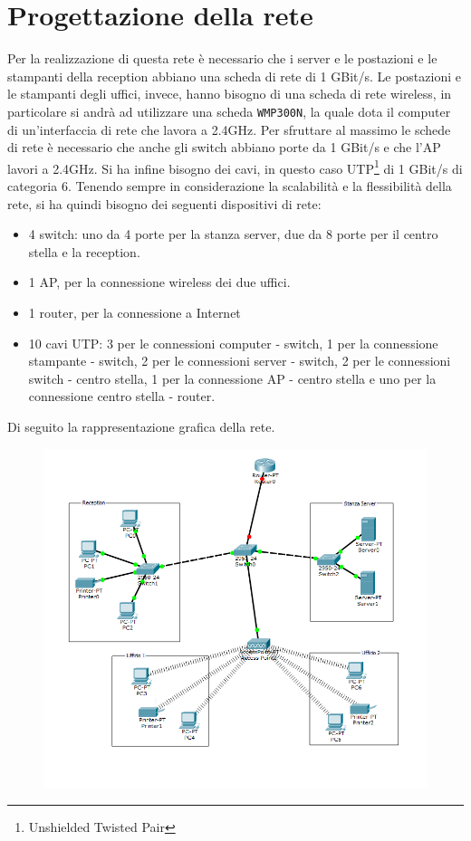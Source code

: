 \section{Progettazione della rete}
\hspace{24pt}Per la realizzazione di questa rete è necessario che i server e le postazioni e le stampanti della reception abbiano una scheda di rete di 1 GBit/s. Le postazioni e le stampanti degli uffici, invece, hanno bisogno di una scheda di rete wireless, in particolare si andrà ad utilizzare una scheda \texttt{WMP300N}, la quale dota il computer di un'interfaccia di rete che lavora a 2.4GHz. Per sfruttare al massimo le schede di rete è necessario che anche gli switch abbiano porte da 1 GBit/s e che l'AP lavori a 2.4GHz. Si ha infine bisogno dei cavi, in questo caso UTP\footnote{Unshielded Twisted Pair} di 1 GBit/s di categoria 6. Tenendo sempre in considerazione la scalabilità e la flessibilità della rete, si ha quindi bisogno dei seguenti dispositivi di rete:\\
\begin{itemize}
	\item 4 switch: uno da 4 porte per la stanza server, due da 8 porte per il centro stella e la reception.
	\item 1 AP, per la connessione wireless dei due uffici.
	\item 1 router, per la connessione a Internet
	\item 10 cavi UTP: 3 per le connessioni computer - switch, 1 per la connessione stampante - switch, 2 per le connessioni server - switch, 2 per le connessioni switch - centro stella, 1 per la connessione AP - centro stella e uno per la connessione centro stella - router.
\end{itemize}
Di seguito la rappresentazione grafica della rete.
\vspace{30pt}
\begin{figure}[!h]
	\includegraphics[scale=0.81]{progettazione_rete}
	\label{fig:pr1}
\end{figure}